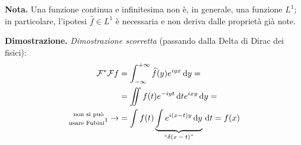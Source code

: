 
\textbf{Nota.} Una funzione continua e infinitesima non è, in generale, una funzione $L^1$; in particolare, l'ipotesi $\hat{f} \in L^1$ è necessaria e non deriva dalle proprietà già note.

\textbf{Dimostrazione.}
\textit{Dimostrazione scorretta} (passando dalla Delta di Dirac dei fisici):
$$
\begin{aligned}
	\mathcal F^* \mathcal F f 
	& = \int_{-\infty}^{+\infty} \hat f(y) e^{iyx} \dd y = \\
	& = \iint f(t) e^{-iyt} \dd t e^{ixy} \dd y = \\
	\substack{\text{non si può} \\ \text{usare Fubini}\footnotemark}\to & = \int f(t) \underbrace{\int e^{i(x-t)y} \dd y}_{\text{``$\delta(x-t)$''}} \dd t = f(x)
\end{aligned}
$$


